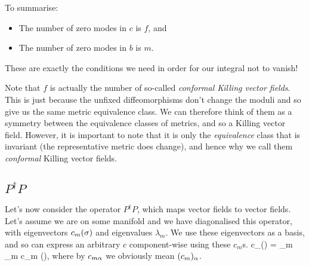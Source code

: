 To summarise:
\begin{itemize}
    \item The number of zero modes in $c$ is $f$, and 
    \item The number of zero modes in $b$ is $m$.
\end{itemize}
These are exactly the conditions we need in order for our integral not to vanish!

\br 
    Note that $f$ is actually the number of so-called \textit{conformal Killing vector fields}. This is just because the unfixed diffeomorphisms don't change the moduli and so give us the same metric equivalence class. We can therefore think of them as a symmetry between the equivalence classes of metrics, and so a Killing vector field. However, it is important to note that it is only the \textit{equivalence} class that is invariant (the representative metric does change), and hence why we call them \textit{conformal} Killing vector fields. 
\er 

\subsection{$P^{\dagger}P$}

Let's now consider the operator $P^{\dagger}P$, which maps vector fields to vector fields. Let's assume we are on some manifold and we have diagonalised this operator, with eigenvectors $c_m(\sigma)$ and eigenvalues $\lambda_m$.  We use these eigenvectors as a basis, and so can express an arbitrary $c$ component-wise using these $c_m$s. 
\bse 
    c_{\a}(\sig) = \sum_m \gamma_m c_{m\a} (\sig),
\ese 
where by $c_{m\alpha}$ we obviously mean $(c_m)_{\alpha}$. 

